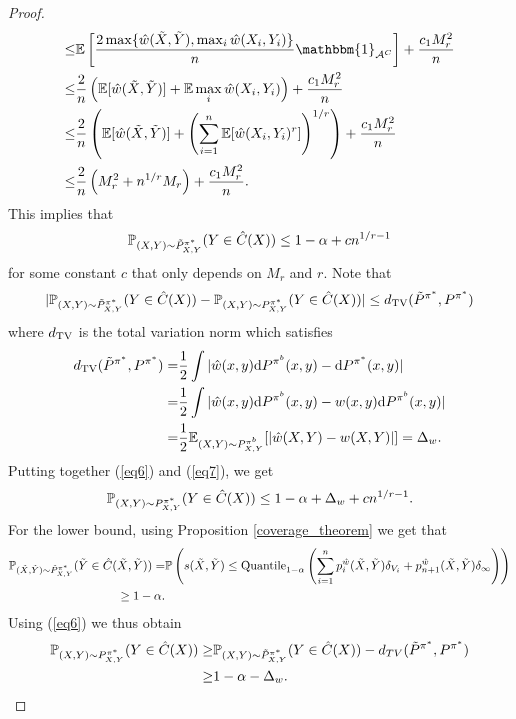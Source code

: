 \begin{proof}
\begin{align}
    \leq& \E\left[ \frac{2\max \{\hat{w}(\tilde{X}, \tilde{Y}), \max_i \hat{w}(X_i, Y_i) \}}{n} \mathbbm{1}_{\mathcal{A}^C} \right] + \frac{c_1 M_r^2}{n} \nonumber \\
    \leq& \frac{2}{n} \left( \E[\hat{w}(\tilde{X}, \tilde{Y})] + \E \max_i \hat{w}(X_i, Y_i) 
    \right) + \frac{c_1 M_r^2}{n} \nonumber \\
    \leq& \frac{2}{n}\left( \E[\hat{w}(\tilde{X}, \tilde{Y})] + \left(\sum_{i=1}^n \E[\hat{w}(X_i, Y_i)^r]\right)^{1/r}\right) + \frac{c_1 M_r^2}{n} \nonumber \\
    \leq& \frac{2}{n}\left(M_r^2 + n^{1/r}M_r \right) + \frac{c_1 M_r^2}{n}.  \nonumber
\end{align} 
This implies that 
\[
\mathbb{P}_{(X,Y)\sim \tilde{P}^{\pi^*}_{X,Y}}(Y \in \hat{C}(X)) \leq 1-\alpha + cn^{1/r-1}
\]
for some constant $c$ that only depends on $M_r$ and $r$.
Note that 
\begin{align}
    | \mathbb{P}_{(X,Y)\sim \tilde{P}^{\pi^*}_{X,Y}}(Y \in \hat{C}(X)) - \mathbb{P}_{(X,Y)\sim P^{\pi^*}_{X,Y}}(Y \in \hat{C}(X)) | \leq d_{\textup{TV}}(\tilde{P}^{\pi^*}, P^{\pi^*})  \label{eq6}
\end{align}
where $d_{\textup{TV}}$ is the total variation norm which satisfies
\begin{align}
    d_{\textup{TV}}(\tilde{P}^{\pi^*}, P^{\pi^*}) =& \frac{1}{2} \int | \hat{w}(x,y)\mathrm{d}P^{\pi^b}(x,y) - \mathrm{d}P^{\pi^*}(x,y) | \nonumber \\
    =& \frac{1}{2} \int | \hat{w}(x,y)\mathrm{d}P^{\pi^b}(x,y) - w(x,y) \mathrm{d}P^{\pi^b}(x,y) | \nonumber\\
    =& \frac{1}{2} \mathbb{E}_{(X,Y)\sim P^{\pi^b}_{X,Y}}[|\hat{w}(X,Y) - w(X,Y) |] = \Delta_w. \label{eq7}
\end{align}
Putting together (\ref{eq6}) and (\ref{eq7}), we get
\begin{align}
    \mathbb{P}_{(X,Y)\sim P^{\pi^*}_{X,Y}}(Y \in \hat{C}(X)) \leq 1-\alpha + \Delta_w + cn^{1/r-1}.
\end{align}
For the lower bound, using Proposition \ref{coverage_theorem} we get that 
\begin{align}
    \mathbb{P}_{(\tilde{X}, \tilde{Y}) \sim \tilde{P}^{\pi^*}_{X,Y}}(\tilde{Y} \in \hat{C}(\tilde{X}, \tilde{Y})) =& \mathbb{P}\left(s(\tilde{X}, \tilde{Y}) \leq \text{Quantile}_{1-\alpha}\left(\sum_{i=1}^n p_i^{\hat{w}}(\tilde{X}, \tilde{Y})\delta_{V_i} + p_{n+1}^{\hat{w}}(\tilde{X}, \tilde{Y})\delta_\infty \right)\right) \nonumber\\
    \geq 1-\alpha.
\end{align}
Using (\ref{eq6}) we thus obtain 
\begin{align}
    \mathbb{P}_{(X,Y)\sim P^{\pi^*}_{X,Y}}(Y \in \hat{C}(X)) \geq& \mathbb{P}_{(X,Y)\sim \tilde{P}^{\pi^*}_{X,Y}}(Y \in \hat{C}(X)) - d_{TV}(\tilde{P}^{\pi^*}, P^{\pi^*}) \nonumber \\
    \geq& 1-\alpha - \Delta_w.
\end{align}
\end{proof}


